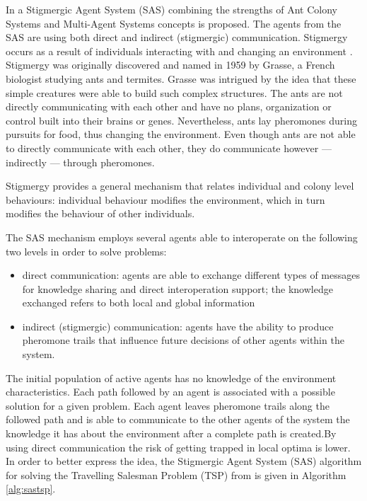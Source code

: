 In \cite{Chira07Stigmergic} a Stigmergic Agent System (SAS) combining the strengths of Ant Colony Systems and Multi-Agent Systems concepts is proposed. The agents from the SAS are using both direct and indirect (stigmergic) communication. 
Stigmergy occurs as a result of individuals interacting with and changing an environment \cite{Dorigo04Ant}. Stigmergy was originally discovered and named in 1959 by Grasse, a French biologist studying ants and termites. Grasse was intrigued by the idea that these simple creatures were able to build such complex structures. The ants are not directly communicating with each other and have no plans, organization or control built into their brains or genes. Nevertheless, ants lay pheromones during pursuits for food, thus changing the environment. Even though ants are not able to directly communicate with each other, they do communicate however --- indirectly --- through pheromones.

Stigmergy provides a general mechanism that relates individual and colony level behaviours: individual behaviour modifies the environment, which in turn modifies the behaviour of other individuals.

The SAS mechanism employs several agents able to interoperate on the following two levels in order to solve problems:
\begin{itemize}
\item
	direct communication: agents are able to exchange different types of messages for  knowledge sharing  and  direct interoperation support; the knowledge exchanged refers to both local and global information
\item
	indirect (stigmergic) communication: agents have the ability to produce pheromone trails that influence future decisions of other agents within the system.
\end{itemize}

The initial population of active agents has no knowledge of the environment characteristics. Each path followed by an agent is associated with a possible solution for a given problem. Each agent leaves pheromone trails along the followed path and is able to communicate to the other agents of the system the knowledge it has about the environment after a complete path is created.By using direct communication the risk of getting trapped in local optima is lower. In order to better express the idea, the Stigmergic Agent System (SAS) algorithm for solving the Travelling Salesman Problem (TSP) from \cite{Chira07Stigmergic} is given in Algorithm \ref{alg:sastsp}.

